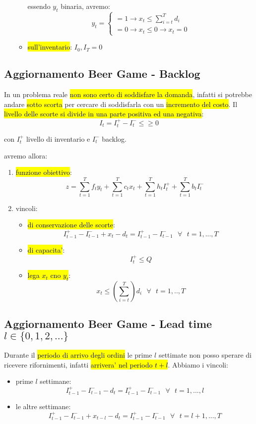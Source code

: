 \begin{enumerate}
\begin{itemize}
            essendo $y_t$ binaria, avremo:
            $$y_t =
            \begin{cases} 
                = 1 \to x_t\leq \sum_{i=t}^T d_i  \\ 
                = 0 \to x_t\leq 0\to x_t=0
            \end{cases}
            $$
        \item \hl{sull'inventario}: $I_0, I_T = 0$
        
    \end{itemize}
\end{enumerate}


\subsection{Aggiornamento Beer Game - Backlog}

In un problema reale \hl{non sono certo di soddisfare la domanda}, infatti si potrebbe andare \hl{sotto scorta} per cercare di soddisfarla con un \hl{incremento del costo}.
Il \hl{livello delle scorte si divide in una parte positiva ed una negativa}:  
$$I_t = I_t^+ -I_t^- \leq \geq 0$$

con $I_t^+$ livello di inventario e $I_t^-$ backlog.

avremo allora:
\begin{enumerate}
    \item \hl{funzione obiettivo}: 
        $$z = \sum_{t=1}^T f_t y_t + \sum_{t=1}^T c_t x_t + \sum_{t=1}^T h_tI_t^+ + \sum_{t=1}^T b_tI_t^-$$
    \item vincoli:
    \begin{itemize}
        \item \hl{di conservazione delle scorte}:
            $$I_{t-1}^+ - I_{t-1}^- + x_t - d_t = I_{t-1}^+ - I_{t-1}^-\ \ \ \forall\ \ \ t=1,...,T$$
        \item \hl{di capacita'}:
            $$I_t^+ \leq Q$$
        \item \hl{lega $x_t$ cno $y_t$}:
            $$x_t \leq (\sum_{i=t}^T) d_i\ \ \ \forall\ \ \ t=1,..,T$$
    \end{itemize}
\end{enumerate}


\subsection{Aggiornamento Beer Game - Lead time $l\in\{0,1,2,...\}$}

Durante il \hl{periodo di arrivo degli ordini} le prime $l$ settimate non posso sperare di ricevere rifornimenti, infatti \hl{arrivera' nel periodo $t+l$}. Abbiamo i vincoli:

\begin{itemize}
    \item prime $l$ settimane: 
        $$I_{t-1}^+ - I_{t-1}^- - d_t = I_{t-1}^+ - I_{t-1}^-\ \ \ \forall\ \ \ t=1,...,l$$
    \item le altre settimane:
        $$I_{t-1}^+ - I_{t-1}^- + x_{t-l} - d_t = I_{t-1}^+ - I_{t-1}^-\ \ \ \forall\ \ \ t=l+1,...,T$$
\end{itemize}
